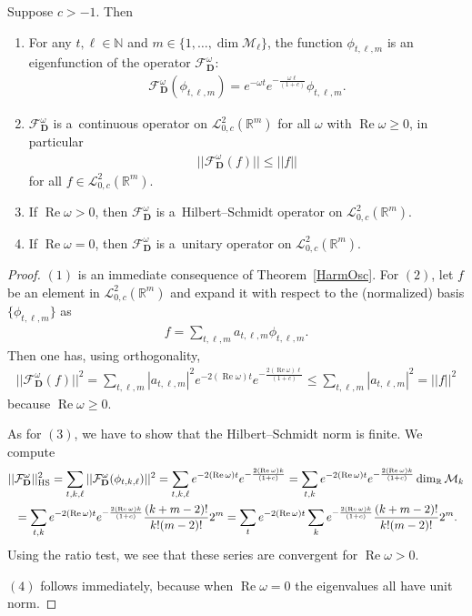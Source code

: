 \documentclass[pdftex]{sigma}
\numberwithin{equation}{section}
\numberwithin{theorem}{section}
\numberwithin{proposition}{section}
\numberwithin{lemma}{section}
\numberwithin{corollary}{section}
\numberwithin{definition}{section}
\numberwithin{example}{section}
\numberwithin{remark}{section}
\numberwithin{note}{section}
\theoremstyle{remark}
\newcommand{\mR}{\mathbb{R}}
\newcommand{\mN}{\mathbb{N}}
\newcommand{\cM}{\mathcal{M}}
\newcommand{\cF}{\mathcal{F}}
\newcommand{\cL}{\mathcal{L}}
\newcommand{\dD}{\textbf{D}}
\def\o{{\omega}}
\begin{document}
\begin{theorem}\label{PropSemigroup}
Suppose $c>-1$.
Then
\begin{enumerate}\itemsep=0pt
\item[$1.$]
For any $t,\ell\in\mN$ and $m\in\{1,\ldots,\dim\cM_{\ell}\}$, the function
$\phi_{t,\ell,m}$ is an eigenfunction of the
operator $\cF_{\dD}^{\o}$:
\begin{gather*}
\cF_{\dD}^{\o}(\phi_{t,\ell,m})=e^{-\o t}e^{-\frac{\o\ell}{(1+c)}}\phi_{t,\ell,m}.
\end{gather*}
\item[$2.$] $\cF_{\dD}^{\o}$ is a~continuous operator on $\cL^{2}_{0,c}(\mR^{m})$ for all $\o$ with $\operatorname{Re}
\o\geq0$, in particular
\begin{gather*}
||\cF_{\dD}^{\o}(f)||\leq||f||
\end{gather*}
for all $f\in\cL^{2}_{0,c}(\mR^{m})$.
\item[$3.$]
If $\operatorname{Re}\o>0$, then $\cF_{\dD}^{\o}$ is a~Hilbert--Schmidt operator on $\cL^{2}_{0,c}(\mR^{m})$.
\item[$4.$]
If $\operatorname{Re}\o=0$, then $\cF_{\dD}^{\o}$ is a~unitary operator on $\cL^{2}_{0,c}(\mR^{m})$.
\end{enumerate}
\end{theorem}

\begin{proof}
$(1)$ is an immediate consequence of Theorem~\ref{HarmOsc}.
For $(2)$, let $f$ be an element in $\cL^{2}_{0,c}(\mR^{m})$ and expand it with respect to the
(normalized) basis $\{\phi_{t,\ell,m}\}$ as
\begin{gather*}
f=\sum_{t,\ell,m}a_{t,\ell,m}\phi_{t,\ell,m}.
\end{gather*}
Then one has, using orthogonality,
\begin{gather*}
||\cF_{\dD}^{\o}(f)||^2 = \sum_{t, \ell, m} |a_{t,\ell,m}|^{2} e^{-2 (\operatorname{Re}{\o}) t} e^{-\frac{2(\operatorname{Re}{\o}) \ell}{(1+c)}}
\leq \sum_{t, \ell, m} |a_{t,\ell,m}|^{2} = ||f||^2
\end{gather*}
because $\operatorname{Re}{\o}\geq0$.

As for $(3)$, we have to show that the Hilbert--Schmidt norm is f\/inite.
We compute
\begin{gather*}
||\cF_{\dD}^{\o}||_{\rm HS}^{2}
= \sum_{t, k, \ell} ||\cF_{\dD}^{\o}(\phi_{t,k,\ell})||^{2}
= \sum_{t, k,\ell} e^{-2 (\operatorname{Re}{\o}) t} e^{-\frac{2 (\operatorname{Re}{\o}) k}{(1+c)}}
= \sum_{t, k} e^{-2 (\operatorname{Re}{\o}) t} e^{-\frac{2 (\operatorname{Re}{\o}) k}{(1+c)}} \dim_{\mR}{\cM_{k}}\\
{} = \sum_{t, k} e^{-2 (\operatorname{Re}{\o}) t} e^{-\frac{2 (\operatorname{Re}{\o}) k}{(1+c)}} \frac{(k + m - 2)!}{k!(m - 2)!}2^{m}
= \sum_{t} e^{-2 (\operatorname{Re}{\o}) t} \sum_{k} e^{-\frac{2 (\operatorname{Re}{\o}) k}{(1+c)}} \frac{(k + m - 2)!}{k!(m - 2)!}2^{m}.
\end{gather*}
Using the ratio test, we see that these series are convergent for $\operatorname{Re}{\o}>0$.

$(4)$ follows immediately, because when $\operatorname{Re}{\o}=0$ the eigenvalues all have unit norm.
\end{proof}
\end{document}
